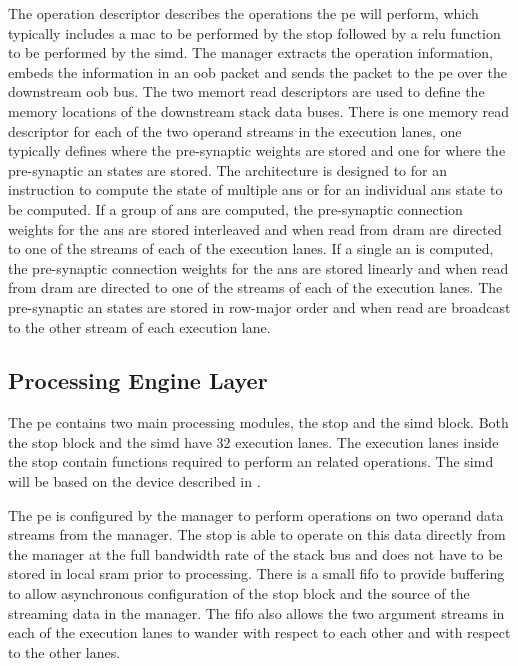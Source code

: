 The operation descriptor describes the operations the \ac{pe} will perform, which typically includes a \ac{mac} to be performed by the \ac{stop} followed by a \ac{relu} \cite{maas2013rectifier} function to be performed by the \ac{simd}.
The manager extracts the operation information, embeds the information in an \ac{oob} packet and sends the packet to the \ac{pe} over the downstream \ac{oob} bus.
The two memort read descriptors are used to define the memory locations of the downstream stack data buses. 
There is one memory read descriptor for each of the two operand streams in the execution lanes, one typically defines where the pre-synaptic weights are stored and one for where the pre-synaptic \ac{an} states are stored.
The architecture is designed to for an instruction to compute the state of multiple \acp{an} or for an individual \acp{an} state to be computed.
If a group of \acp{an} are computed, the pre-synaptic connection weights for the \acp{an} are stored interleaved and when read from \ac{dram} are directed to one of the streams of each of the execution lanes.
If a single \ac{an} is computed, the pre-synaptic connection weights for the \acp{an} are stored linearly and when read from \ac{dram} are directed to one of the streams of each of the execution lanes.
The pre-synaptic \ac{an} states are stored in row-major order and when read are broadcast to the other stream of each execution lane.



\subsection{Processing Engine Layer}
\label{sec:Processing Engine Layer}
The \ac{pe} contains two main processing modules, the \ac{stop} and the \ac{simd} block.
Both the \ac{stop} block and the \ac{simd} have 32 execution lanes. The execution lanes inside the \ac{stop} contain functions required to perform \ac{an} related operations.
The \ac{simd} will be based on the device described in \cite{schabel2014diss}.


The \ac{pe} is configured by the manager to perform operations on two operand data streams from the manager. 
The \ac{stop} is able to operate on this data directly from the manager at the full bandwidth rate of the stack bus and does not have to be stored in local \ac{sram} prior to processing. 
There is a small \ac{fifo} to provide buffering to allow asynchronous configuration of the \ac{stop} block and the source of the streaming data in the manager. 
The \ac{fifo} also allows the two argument streams in each of the execution lanes to wander with respect to each other and with respect to the other lanes.

